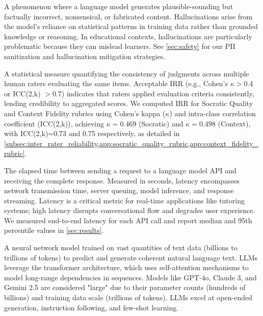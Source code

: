 \begin{description}[style=nextline,leftmargin=0em,itemsep=1em]
\item[\textbf{Hallucination}] A phenomenon where a language model generates plausible-sounding but factually incorrect, nonsensical, or fabricated content. Hallucinations arise from the model's reliance on statistical patterns in training data rather than grounded knowledge or reasoning. In educational contexts, hallucinations are particularly problematic because they can mislead learners. See \cref{sec:safety} for our PII sanitization and hallucination mitigation strategies.

\item[\textbf{Inter-Rater Reliability (IRR)}] A statistical measure quantifying the consistency of judgments across multiple human raters evaluating the same items. Acceptable IRR (e.g., Cohen's $\kappa > 0.4$ or ICC(2,k) $> 0.7$) indicates that raters applied evaluation criteria consistently, lending credibility to aggregated scores. We computed IRR for Socratic Quality and Context Fidelity rubrics using Cohen's kappa ($\kappa$) and intra-class correlation coefficient (ICC(2,k)), achieving $\kappa=0.469$ (Socratic) and $\kappa=0.498$ (Context), with ICC(2,k)=0.73 and 0.75 respectively, as detailed in \cref{subsec:inter_rater_reliability,app:socratic_quality_rubric,app:context_fidelity_rubric}.

\item[\textbf{Latency}] The elapsed time between sending a request to a language model API and receiving the complete response. Measured in seconds, latency encompasses network transmission time, server queuing, model inference, and response streaming. Latency is a critical metric for real-time applications like tutoring systems; high latency disrupts conversational flow and degrades user experience. We measured end-to-end latency for each API call and report median and 95th percentile values in \cref{sec:results}.

\item[\textbf{LLM (Large Language Model)}] A neural network model trained on vast quantities of text data (billions to trillions of tokens) to predict and generate coherent natural language text. LLMs leverage the transformer architecture, which uses self-attention mechanisms to model long-range dependencies in sequences. Models like GPT-4o, Claude 3, and Gemini 2.5 are considered "large" due to their parameter counts (hundreds of billions) and training data scale (trillions of tokens). LLMs excel at open-ended generation, instruction following, and few-shot learning.


\end{description}
